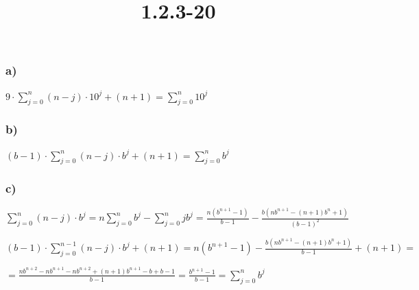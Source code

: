 \documentclass{article}
\title{1.2.3-20}
\begin{document}
\maketitle

\subsubsection*{a)}

\( 9 \cdot \sum_{j=0}^{n} (n-j)\cdot10^j + (n + 1) = \sum_{j=0}^{n} 10^{j} \)

\subsubsection*{b)}

\( (b-1) \cdot \sum_{j=0}^{n} (n-j)\cdot b^j + (n + 1) = \sum_{j=0}^{n} b^{j} \)

\subsubsection*{c)}

\( \sum_{j=0}^{n} (n-j)\cdot b^j = n \sum_{j=0}^{n} b^j - \sum_{j=0}^{n} jb^j = \frac{n(b^{n+1}-1)}{b-1} - \frac{b(nb^{n+1}-(n+1)b^n+1)}{(b-1)^2} \)

\( (b-1) \cdot \sum_{j=0}^{n-1} (n-j)\cdot b^j + (n + 1) = n(b^{n+1}-1) - \frac{b(nb^{n+1}-(n+1)b^n+1)}{b-1} + (n+1) = \)

\( = \frac{nb^{n+2} - nb^{n+1} - nb^{n+2} + (n+1)b^{n+1} - b + b - 1}{b-1} = \frac{b^{n+1} - 1}{b-1} = \sum_{j=0}^n b^j \)
\end{document}
